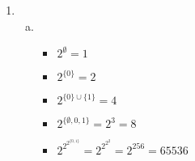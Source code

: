 \documentclass{article}
\begin{document}
\begin{enumerate}
\begin{enumerate}[(a)]
\begin{enumerate}[(i)]
      \begin{proof}
      let $y=x+1$.\\$x<y$ is true $\forall x,y\because x<x+1$\\
      \(\implies(x<y)\to(x^2<y^2)\) is true if $(x^2<y^2)$ is true.\\
      \(y^2=(x+1)^2=x^2+2x+1\implies y^2>x^2\)\\
      \(\therefore (x<y)\to(x^2<y^2)\) is true when $y=x+1$.\\
      \(\therefore \exists y\in\mathbb{Z} (y=x+1) \forall x\in\mathbb{Z}((x<y)\to(x^2<y^2))\)
      \end{proof}
    \end{enumerate}

    \item %
    \begin{enumerate}[(i)]
      \item %
            let $x=6,y=5. \implies\ x^2=36,\ y+1=6.\ 36>6\therefore$  \textbf{false.}
      \item %
            let $x=2,y=5. \implies x^2=4,\ y+1=6.\ 4<6\therefore$ \textbf{true.}
      \item %
            let $y=-1. \implies y+1=0. \forall x\in\mathbb{Z},x^2\ge0\therefore \nexists x\mid x^2<0\therefore$ \textbf{false.}
      \item%
            let $x=0, \implies x^2=0.\ \text{if }y>0,\implies y>x\ \text{but also}\ y^2>0\therefore (x^2<y^2)\ \text{is true}.\ \text{if}\ y<=0,\implies y<x\therefore ((x<y)\to(x^2<y^2))\ \text{is true}.\therefore$ \textbf{true.}
    \end{enumerate}
  \end{enumerate}

  \item
  \begin{enumerate}[(a)]
    \item %
    \begin{itemize}
      \item $2^{\emptyset}=1$

      \item $2^{\{0\}}=2$

      \item $2^{\{0\} \cup \{1\}}=4$

      \item $2^{\{\emptyset, 0, 1\}}=2^{3}=8$

      \item $2^{2^{2^{\{0,1\}}}}=2^{2^{2^{2}}}=2^{256}=65536$


\end{itemize}
\end{enumerate}
\end{enumerate}
\end{document}
